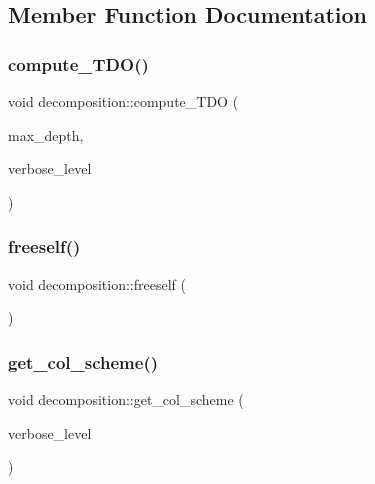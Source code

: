 \subsection{Member Function Documentation}
\mbox{\label{classdecomposition_acde2ae0342c89d2ba817ecdc98813cbe}} 
\subsubsection{\texorpdfstring{compute\+\_\+\+T\+D\+O()}{compute\_TDO()}}
{\footnotesize\ttfamily void decomposition\+::compute\+\_\+\+T\+DO (\begin{DoxyParamCaption}\item[{\mbox{\hyperlink{galois_8h_a09fddde158a3a20bd2dcadb609de11dc}{I\+NT}}}]{max\+\_\+depth,  }\item[{\mbox{\hyperlink{galois_8h_a09fddde158a3a20bd2dcadb609de11dc}{I\+NT}}}]{verbose\+\_\+level }\end{DoxyParamCaption})}

\mbox{\label{classdecomposition_ab15b8062ad9c42007710da27928a6b2d}} 
\subsubsection{\texorpdfstring{freeself()}{freeself()}}
{\footnotesize\ttfamily void decomposition\+::freeself (\begin{DoxyParamCaption}{ }\end{DoxyParamCaption})}

\mbox{\label{classdecomposition_a998bb452e79a9e4afb13dd2c577f4bf3}} 
\subsubsection{\texorpdfstring{get\+\_\+col\+\_\+scheme()}{get\_col\_scheme()}}
{\footnotesize\ttfamily void decomposition\+::get\+\_\+col\+\_\+scheme (\begin{DoxyParamCaption}\item[{\mbox{\hyperlink{galois_8h_a09fddde158a3a20bd2dcadb609de11dc}{I\+NT}}}]{verbose\+\_\+level }\end{DoxyParamCaption})}

